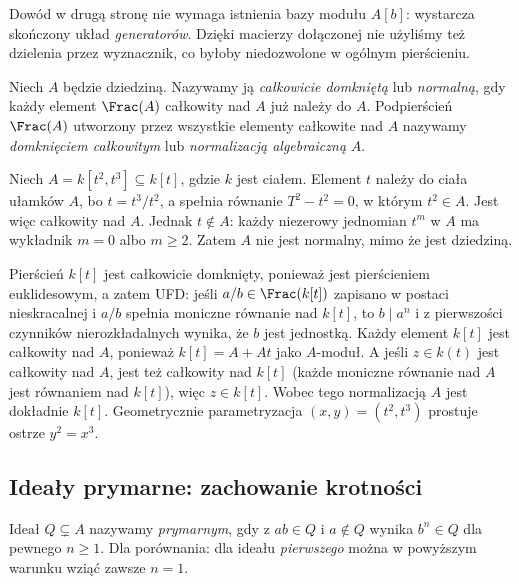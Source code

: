 \begin{uwaga}
Dowód w drugą stronę nie wymaga istnienia bazy modułu
$A[b]$: wystarcza skończony układ \emph{generatorów}.
Dzięki macierzy dołączonej nie użyliśmy też dzielenia
przez wyznacznik, co byłoby niedozwolone w ogólnym
pierścieniu.
\end{uwaga}

\begin{definicja}
Niech $A$ będzie dziedziną. Nazywamy ją
\emph{całkowicie domkniętą} lub \emph{normalną},
gdy każdy element $\Frac(A)$ całkowity nad $A$
już należy do $A$. Podpierścień $\Frac(A)$
utworzony przez wszystkie elementy całkowite nad $A$
nazywamy \emph{domknięciem całkowitym} lub
\emph{normalizacją algebraiczną} $A$.
\end{definicja}

\begin{przyklad}
\label{prz:normalizacja-ostrza}
Niech $A=k[t^2,t^3]\subseteq k[t]$, gdzie $k$ jest ciałem.
Element $t$ należy do ciała ułamków $A$, bo
$t=t^3/t^2$, a spełnia równanie $T^2-t^2=0$,
w którym $t^2\in A$. Jest więc całkowity nad $A$.
Jednak $t\notin A$: każdy niezerowy jednomian $t^m$
w $A$ ma wykładnik $m=0$ albo $m\ge2$.
Zatem $A$ nie jest normalny, mimo że jest dziedziną.

Pierścień $k[t]$ jest całkowicie domknięty, ponieważ
jest pierścieniem euklidesowym, a zatem UFD: jeśli
$a/b\in\Frac(k[t])$ zapisano w postaci nieskracalnej
i $a/b$ spełnia moniczne równanie nad $k[t]$, to
$b\mid a^n$ i z pierwszości czynników nierozkładalnych
wynika, że $b$ jest jednostką. Każdy element $k[t]$
jest całkowity nad $A$, ponieważ
$k[t]=A+At$ jako $A$-moduł. A jeśli $z\in k(t)$
jest całkowity nad $A$, jest też całkowity nad $k[t]$
(każde moniczne równanie nad $A$ jest równaniem nad
$k[t]$), więc $z\in k[t]$. Wobec tego normalizacją
$A$ jest dokładnie $k[t]$.
Geometrycznie parametryzacja $(x,y)=(t^2,t^3)$
prostuje ostrze $y^2=x^3$.
\end{przyklad}

\subsection{Ideały prymarne: zachowanie krotności}
\begin{definicja}
Ideał $Q\subsetneq A$ nazywamy \emph{prymarnym},
gdy z $ab\in Q$ i $a\notin Q$ wynika
$b^n\in Q$ dla pewnego $n\ge1$.
Dla porównania: dla ideału \emph{pierwszego} można
w powyższym warunku wziąć zawsze $n=1$.
\end{definicja}

